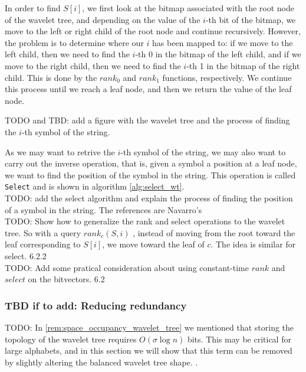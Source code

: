 \noindent In order to find $S[i]$, we first look at the bitmap associated with the root node of the wavelet tree, and depending on the value of the $i$-th bit of the bitmap, we move to the left or right child of the root node and continue recursively. However, the problem is to determine where our $i$ has been mapped to: if we move to the left child, then we need to find the $i$-th 0 in the bitmap of the left child, and if we move to the right child, then we need to find the $i$-th 1 in the bitmap of the right child. This is done by the $rank_0$ and $rank_1$ functions, respectively. We continue this process until we reach a leaf node, and then we return the value of the leaf node.

\begin{example}
    TODO and TBD: add a figure with the wavelet tree and the process of finding the $i$-th symbol of the string.
\end{example}

\noindent As we may want to retrive the $i$-th symbol of the string, we may also want to carry out the inverse operation, that is, given a symbol a position at a leaf node, we want to find the position of the symbol in the string. This operation is called \texttt{Select} and is shown in algorithm \ref{alg:select_wt}.\\

\noindent TODO: add the select algorithm and explain the process of finding the position of a symbol in the string. The references are Navarro's \cite{WTForALL,navarro2016compact} \\

\noindent TODO: Show how to generalize the rank and select operations to the wavelet tree. So with a query $rank_c(S,i)$ , instead of moving from the root toward the leaf corresponding to $S[i]$, we move toward the leaf of $c$. The idea is similar for select. \cite{navarro2016compact} 6.2.2 \\

\noindent TODO: Add some pratical consideration about using constant-time $rank$ and $select$ on the bitvectors. \cite{navarro2016compact} 6.2

\subsubsection*{TBD if to add: Reducing redundancy}
TODO: In \ref{rem:space_occupancy_wavelet_tree} we mentioned that storing the topology of the wavelet tree requires $O(\sigma \log n)$ bits. This may be critical for large alphabets, and in this section we will show that this term can be removed by slightly altering the balanced wavelet tree shape. \cite{MAKINEN2007332,MAKINEN2006703}.

